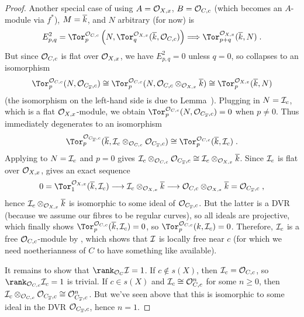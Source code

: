 \documentclass[a4paper,parskip=half,numbers=enddot, DIV=12]{scrreprt}
\renewcommand{\geq}{\geqslant}
\begin{document}
\begin{proof}
	Another special case of  using $A=\mathcal{O}_{X,x}$, $B=\mathcal{O}_{C,c}$ (which becomes an $A$-module via $f^*$), $M=\overline{k}$, and $N$ arbitrary (for now) is
	\begin{align}\lbl{eq:TorSS2}
		E_{p,q}^2=\Tor_p^{\Oo_{C,c}}\left(N,\Tor_q^{\Oo_{X,x}}(\ov{k},\Oo_{C,c})\right)\converge\Tor_{p+q}^{\Oo_{X,x}}(\ov{k},N)\;.
	\end{align}
	But since $\mathcal{O}_{C,c}$ is flat over $\mathcal{O}_{X,x}$, we have $E_{p,q}^2=0$ unless $q=0$, so  collapses to an isomorphism
	\begin{align}\lbl{eq:TorSS3}
	 	\Tor_p^{\Oo_{C,c}}(N,\Oo_{C_{\ov{x}},c})\cong\Tor_p^{\Oo_{C,c}}(N,\Oo_{C,c}\otimes_{\Oo_{X,x}}\ov{k})\cong\Tor_p^{\Oo_{X,x}}(\ov{k},N)
	\end{align}
	(the isomorphism on the left-hand side is due to Lemma~). Plugging in $N=\mathcal{I}_c$, which is a flat $\mathcal{O}_{X,x}$-module, we obtain $\Tor_p^{\Oo_{C,c}}(N,\Oo_{C_{\ov{x}},c})=0$ when $p\neq 0$. Thus  immediately degenerates to an isomorphism
	\begin{align*}
		\Tor_p^{\Oo_{C_{\ov{x}},c}}(\ov{k},\Ii_c\otimes_{\Oo_{C,c}}\Oo_{C_{\ov{x}},c})\cong\Tor_p^{\Oo_{C,c}}(\ov{k},\Ii_c)\;.
	\end{align*}
	Applying  to $N=\mathcal{I}_c$ and $p=0$ gives $\mathcal{I}_c\otimes_{\mathcal{O}_{C,c}}\mathcal{O}_{C_{\overline{x}},c}\cong \mathcal{I}_c\otimes_{\mathcal{O}_{X,x}}\overline{k}$. Since $\mathcal{I}_c$ is flat over $\mathcal{O}_{X,x}$,  gives an exact sequence
	\begin{align*}
		0=\Tor_1^{\Oo_{X,x}}(\ov{k},\Ii_c)\morphism \Ii_c\otimes_{\Oo_{X,x}}\ov{k}\morphism\Oo_{C,c}\otimes_{\Oo_{X,x}}\ov{k}=\Oo_{C_{\ov{x}},c}\;,
	\end{align*}
	hence $\mathcal{I}_c\otimes_{\mathcal{O}_{X,x}}\overline{k}$ is isomorphic to some ideal of $\mathcal{O}_{C_{\overline{x}},c}$. But the latter is a DVR (because we assume our fibres to be regular curves), so all ideals are projective, which finally shows $\Tor_p^{\Oo_{C,c}}(\ov{k},\Ii_c)=0$, so $\Tor_p^{\Oo_{C,c}}(k,\Ii_c)=0$. Therefore, $\mathcal{I}_c$ is a free $\mathcal{O}_{C,c}$-module by \cite[Proposition~1.3.1]{homalg}, which shows that $\mathcal{I}$ is locally free near $c$ (for which we need noetherianness of $C$ to have something like \cite[Corollary~1.5.1]{alg2} available).
	
	It remains to show that $\rank_{\Oo_C} \Ii=1$. If $c\notin s(X)$, then $\mathcal{I}_c=\mathcal{O}_{C,c}$, so $\rank_{\Oo_{C,c}}\Ii_c=1$ is trivial. If $c\in s(X)$ and $\mathcal{I}_c\cong \mathcal{O}_{C,c}^n$ for some $n\geq 0$, then $\mathcal{I}_c\otimes_{\mathcal{O}_{C,c}}\mathcal{O}_{C_{\overline{x}},c}\cong \mathcal{O}_{C_{\overline{x}},c}^n$. But we've seen above that this is isomorphic to some ideal in the DVR $\mathcal{O}_{C_{\overline{x}},c}$, hence $n=1$.
\end{proof}
\end{document}
